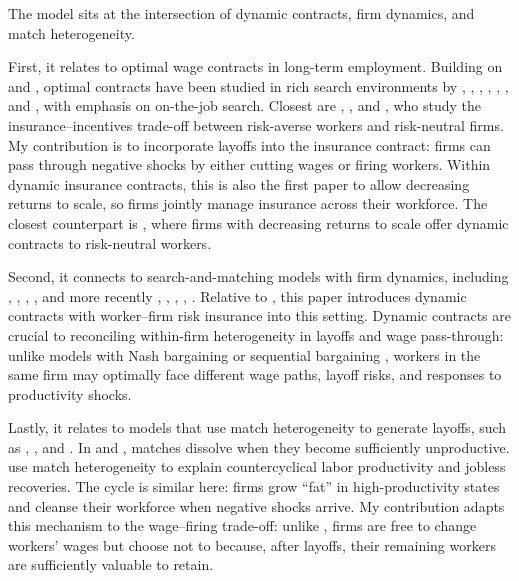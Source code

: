 The model sits at the intersection of dynamic contracts, firm dynamics, and match heterogeneity. 

First, it relates to optimal wage contracts in long-term employment. Building on \textcite{thomas1988} and \textcite{holmstrom1982}, optimal contracts have been studied in rich search environments by \textcite{burdett2003}, \textcite{menzio2011}, \textcite{fukui}, \textcite{balke2022}, \textcite{souchier2022}, \textcite{cedomir2024}, and \textcite{elsby2024}, with emphasis on on-the-job search. Closest are \textcite{balke2022}, \textcite{souchier2022}, and \textcite{cedomir2024}, who study the insurance–incentives trade-off between risk-averse workers and risk-neutral firms. My contribution is to incorporate layoffs into the insurance contract: firms can pass through negative shocks by either cutting wages or firing workers. Within dynamic insurance contracts, this is also the first paper to allow decreasing returns to scale, so firms jointly manage insurance across their workforce. The closest counterpart is \textcite{schaal2017}, where firms with decreasing returns to scale offer dynamic contracts to risk-neutral workers.

Second, it connects to search-and-matching models with firm dynamics, including \textcite{acemoglu2014}, \textcite{elsby2013}, \textcite{kaas2015}, \textcite{schaal2017}, and more recently \textcite{gulyas2020}, \textcite{bilal2022}, \textcite{elsby2022}, \textcite{mccrary2022}, \textcite{rudanko2023}. Relative to \textcite{schaal2017}, this paper introduces dynamic contracts with worker–firm risk insurance into this setting. Dynamic contracts are crucial to reconciling within-firm heterogeneity in layoffs and wage pass-through: unlike models with Nash bargaining \parencite{mccrary2022} or sequential bargaining \parencite{bilal2022}, workers in the same firm may optimally face different wage paths, layoff risks, and responses to productivity shocks.

Lastly, it relates to models that use match heterogeneity to generate layoffs, such as \textcite{berger2011}, \textcite{menzio2011}, and \textcite{gregory2021}. In \textcite{menzio2011} and \textcite{gregory2021}, matches dissolve when they become sufficiently unproductive. \textcite{berger2011} use match heterogeneity to explain countercyclical labor productivity and jobless recoveries. The cycle is similar here: firms grow “fat” in high-productivity states and cleanse their workforce when negative shocks arrive. My contribution adapts this mechanism to the wage–firing trade-off: unlike \textcite{berger2011}, firms are free to change workers’ wages but choose not to because, after layoffs, their remaining workers are sufficiently valuable to retain.

